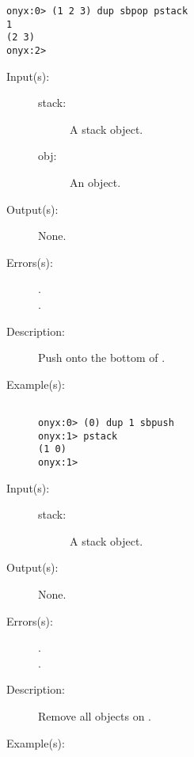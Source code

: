 \begin{description}
\begin{description}
\begin{verbatim}
onyx:0> (1 2 3) dup sbpop pstack
1
(2 3)
onyx:2>
		\end{verbatim}
	\end{description}
\label{systemdict:sbpush}
\item[{\onyxop{stack obj}{sbpush}{--}}: ]
	\begin{description}\item[]
	\item[Input(s): ]
		\begin{description}\item[]
		\item[stack: ]
			A stack object.
		\item[obj: ]
			An object.
		\end{description}
	\item[Output(s): ] None.
	\item[Errors(s): ]
		\begin{description}\item[]
		\item[.]
		\item[.]
		\end{description}
	\item[Description: ]
		Push  onto the bottom of .
	\item[Example(s): ]\begin{verbatim}

onyx:0> (0) dup 1 sbpush
onyx:1> pstack
(1 0)
onyx:1>
		\end{verbatim}
	\end{description}
\label{systemdict:sclear}
\item[{\onyxop{stack}{sclear}{--}}: ]
	\begin{description}\item[]
	\item[Input(s): ]
		\begin{description}\item[]
		\item[stack: ]
			A stack object.
		\end{description}
	\item[Output(s): ] None.
	\item[Errors(s): ]
		\begin{description}\item[]
		\item[.]
		\item[.]
		\end{description}
	\item[Description: ]
		Remove all objects on .
	\item[Example(s): ]\begin{verbatim}


\end{verbatim}
\end{description}
\end{description}
